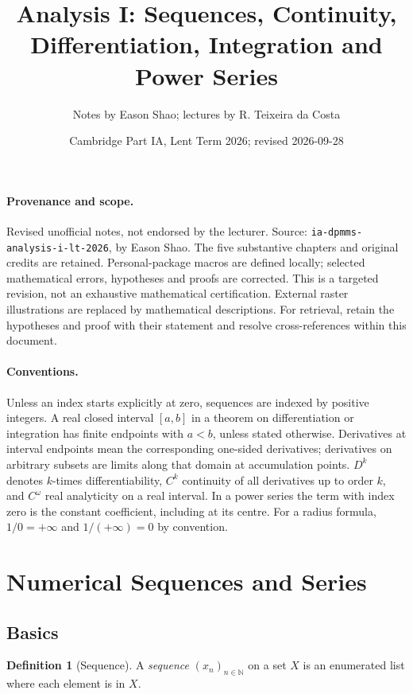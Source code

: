 \documentclass[11pt]{article}
\title{Analysis I: Sequences, Continuity, Differentiation, Integration and Power Series}
\author{Notes by Eason Shao; lectures by R. Teixeira da Costa}
\date{Cambridge Part IA, Lent Term 2026; revised 2026-09-28}
\numberwithin{equation}{section}
\theoremstyle{definition}
\newtheorem{definition}[theorem]{Definition}
\theoremstyle{remark}
\newcommand{\pqty}[1]{\left(#1\right)}
\newcommand{\NN}{\mathbb N}
\begin{document}
\maketitle
\paragraph{Provenance and scope.}
Revised unofficial notes, not endorsed by the lecturer. Source:
\texttt{ia-dpmms-analysis-i-lt-2026}, by Eason Shao.
The five substantive chapters and original credits are retained. Personal-package
macros are defined locally; selected mathematical errors, hypotheses and proofs
are corrected. This is a targeted revision, not an exhaustive mathematical certification.
External raster illustrations are replaced by mathematical descriptions.
For retrieval, retain the hypotheses and proof with their statement and resolve
cross-references within this document.
\paragraph{Conventions.}
Unless an index starts explicitly at zero, sequences are indexed by positive integers.
A real closed interval \([a,b]\) in a theorem on differentiation or integration
has finite endpoints with \(a<b\), unless stated otherwise. Derivatives at interval
endpoints mean the corresponding one-sided derivatives; derivatives on arbitrary
subsets are limits along that domain at accumulation points.
\(D^k\) denotes \(k\)-times differentiability, \(C^k\) continuity of all derivatives
up to order \(k\), and \(C^\omega\) real analyticity on a real interval.
In a power series the term with index zero is the constant coefficient, including at its centre. For a radius formula, \(1/0=+\infty\) and \(1/(+\infty)=0\) by convention.
\tableofcontents
\section{Numerical Sequences and Series}
\subsection{Basics}

\begin{definition}[Sequence]\label{analysis-unit-0001}
    \label{def:sequence}%
    A \emph{sequence} \(\pqty{x_n}_{n \in \NN}\) on a set \(X\) is an enumerated list where each element is in \(X\).
\end{definition}
\end{document}
